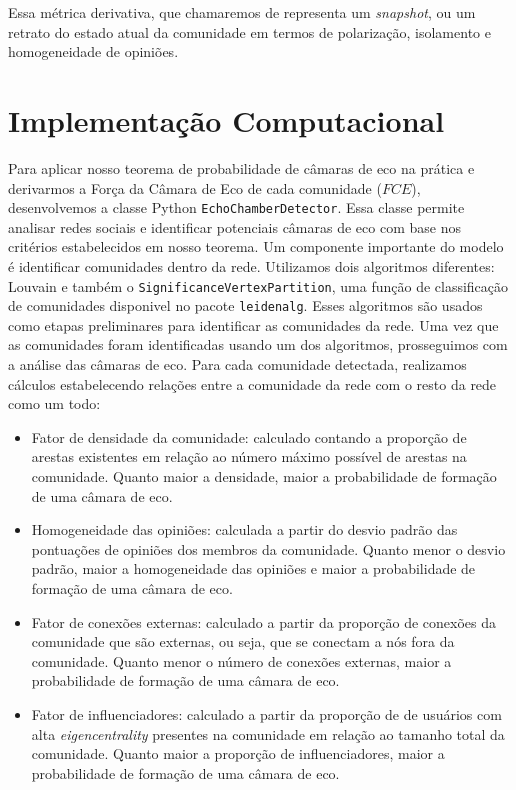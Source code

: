 Essa métrica derivativa, que chamaremos de  representa um \textit{snapshot}, ou um retrato do estado atual da comunidade em termos de polarização, isolamento e homogeneidade de opiniões.

\section{Implementação Computacional}

Para aplicar nosso teorema de probabilidade de câmaras de eco na prática e derivarmos a Força da Câmara de Eco de cada comunidade ($FCE$), desenvolvemos a classe Python \texttt{EchoChamberDetector}. Essa classe permite analisar redes sociais e identificar potenciais câmaras de eco com base nos critérios estabelecidos em nosso teorema. Um componente importante do modelo é identificar comunidades dentro da rede. Utilizamos dois algoritmos diferentes: Louvain e também o \texttt{SignificanceVertexPartition}, uma função de classificação de comunidades disponivel no pacote \texttt{leidenalg}. Esses algoritmos são usados como etapas preliminares para identificar as comunidades da rede. Uma vez que as comunidades foram identificadas usando um dos algoritmos, prosseguimos com a análise das câmaras de eco. Para cada comunidade detectada, realizamos cálculos estabelecendo relações entre a comunidade da rede com o resto da rede como um todo:

\begin{itemize}
	\item Fator de densidade da comunidade: calculado contando a proporção de arestas existentes em relação ao número máximo possível de arestas na comunidade. Quanto maior a densidade, maior a probabilidade de formação de uma câmara de eco.
	\item Homogeneidade das opiniões: calculada a partir do desvio padrão das pontuações de opiniões dos membros da comunidade. Quanto menor o desvio padrão, maior a homogeneidade das opiniões e maior a probabilidade de formação de uma câmara de eco.
	\item Fator de conexões externas: calculado a partir da proporção de conexões da comunidade que são externas, ou seja, que se conectam a nós fora da comunidade. Quanto menor o número de conexões externas, maior a probabilidade de formação de uma câmara de eco.
	\item Fator de influenciadores: calculado a partir da proporção de de usuários com alta \textit{eigencentrality} presentes na comunidade em relação ao tamanho total da comunidade. Quanto maior a proporção de influenciadores, maior a probabilidade de formação de uma câmara de eco.
\end{itemize}

